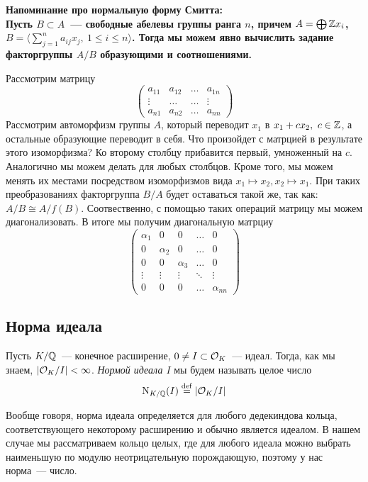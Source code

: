 	
	\noindent\bf{Напоминание про нормальную форму Смитта:}\\
	Пусть $B \subset A$~--- свободные абелевы группы ранга $n$, причем $A = \bigoplus \mathbb{Z} x_{i}$, $B = \langle \sum_{j = 1}^{n} a_{i j} x_{j}, \ 1 \le i \le n \rangle$.  Тогда мы можем явно вычислить задание факторгруппы $A/B$ образующими и соотношениями. 

	Рассмотрим матрицу 
	\[
		\begin{pmatrix} a_{11} & a_{12} & \ldots & a_{1n} \\ \vdots & \ldots & \ldots & \vdots \\ a_{n 1} & a_{n 2} & \ldots & a_{n n} \end{pmatrix}
	\]
	Рассмотрим автоморфизм группы $A$, который переводит $x_{1}$ в $x_{1} + c x_{2}, \ c \in \mathbb{Z}$, а остальные образующие переводит в себя. 
	Что произойдет с матрцией в результате этого изоморфизма?  Ко второму столбцу прибавится первый, умноженный на $c$.  Аналогично мы можем делать для любых столбцов. Кроме того, мы можем менять их местами посредством изоморфизмов вида $x_{1} \mapsto x_{2}, x_{2} \mapsto x_{1}$. При таких преобразованиях факторгруппа $B/A$ будет оставаться такой же, так как: $A/B \cong A / f(B)$. Соотвественно, с помощью таких операций матрицу мы можем диагонализовать. В итоге мы получим диагональную матрциу 
	\[
		\begin{pmatrix} \alpha_{1} & 0 & 0 & \ldots & 0 \\ 0 & \alpha_{2} & 0 & \ldots & 0 \\ 0 & 0 & \alpha_{3} & \ldots &  0  \\ \vdots & \vdots & \vdots & \ddots & \vdots  \\ 0 & 0 & 0 & \ldots & \alpha_{nn}\end{pmatrix}
	\]

	\subsection{Норма идеала}

	\begin{definition} 
		Пусть $K/\mathbb{Q}$~--- конечное расширение, $0 \neq I \subset \mathcal{O}_{K}$~--- идеал. Тогда, как мы знаем, $|\mathcal{O}_{K}/I| < \infty$. \emph{Нормой идеала $I$} мы будем называть целое число
		\[
			\mathrm{N}_{K/\Q}\lr*{I} \eqdef \left\lvert \cO_{K} / I \right\rvert
		\]
	\end{definition}

	\begin{remark}
		Вообще говоря, норма идеала определяется для любого дедекиндова кольца, соответствующего некоторому расширению и обычно является идеалом. В нашем случае мы рассматриваем кольцо целых, где для любого идеала можно выбрать наименьшую по модулю неотрицательную порождающую, поэтому у нас норма~--- число. 
	\end{remark}


